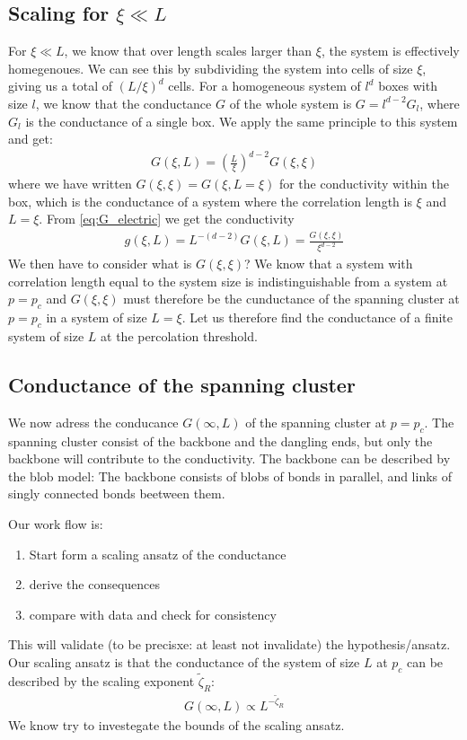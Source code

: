 \documentclass[reprint, amsmath, amssymb, aps]{revtex4-2}
\newcommand{\zetaR}{\tilde{\zeta}_R}
\begin{document}
\subsection{Scaling for $\xi \ll L$ }
For $\xi \ll L$, we know that over length scales larger than $\xi$, the system is effectively homegenoues. We can see this by subdividing the system into cells of size $\xi$, giving us a total of $(L/\xi)^d$ cells. For a homogeneous system of $l^d$ boxes with size $l$, we know that the conductance $G$ of the whole system is $G = l^{d-2}G_l$, where $G_l$ is the conductance of a single box. We apply the same principle to this system and get:
\begin{align*}
  G(\xi,L) = \left(\frac{L}{\xi}\right)^{d-2}G(\xi, \xi)
\end{align*}
where we have written $G(\xi, \xi) =  G(\xi, L=\xi)$ for the conductivity within the box, which is the conductance of a system where the correlation length is $\xi$ and $L = \xi$. From \ref{eq:G_electric} we get the conductivity
\begin{align}
  g(\xi, L) = L^{-(d-2)} G(\xi,L) = \frac{G(\xi, \xi)}{\xi^{d-2}}
  \label{eq:g(xi,L)}
\end{align}
We then have to consider what is $G(\xi, \xi)$? We know that a system with correlation length equal to the system size is indistinguishable from a system at $p = p_c$ and $G(\xi, \xi)$ must therefore be the cunductance of the spanning cluster at $p=p_c$ in a system of size $L = \xi$. Let us therefore find the conductance of a finite system of size $L$ at the percolation threshold.
\subsection{Conductance of the spanning cluster}
We now adress the conducance $G(\infty, L)$ of the spanning cluster at $p=p_c$. The spanning cluster consist of the backbone and the dangling ends, but only the backbone will contribute to the conductivity. The backbone can be described by the blob model: The backbone consists of blobs of bonds in parallel, and links of singly connected bonds beetween them. \par
Our work flow is:
\begin{enumerate}
  \item Start form a scaling ansatz of the conductance
  \item derive the consequences
  \item compare with data and check for consistency
\end{enumerate}
This will validate (to be precisxe: at least not invalidate) the hypothesis/ansatz. Our scaling ansatz is that the conductance of the system of size $L$ at $p_c$ can be described by the scaling exponent $\zetaR$:
\begin{align}
  G(\infty, L) \propto L^{-\zetaR}
  \label{eq:zeta_ansatz}
\end{align}
We know try to investegate the bounds of the scaling ansatz.
\end{document}
